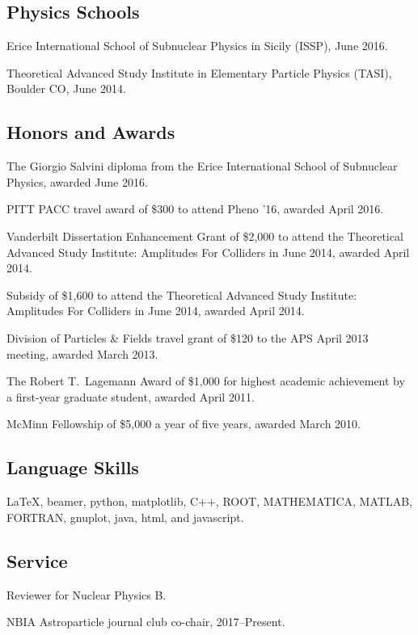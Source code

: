 \documentclass[letterpaper]{article}
\renewenvironment{itemize}{
\begin{list}{}{
\setlength{\leftmargin}{1.5em}
}
}{
\end{list}
}
\begin{document}
\subsection*{Physics Schools}
\begin{itemize}
\item Erice International School of Subnuclear Physics in Sicily (ISSP), June 2016.
\item Theoretical Advanced Study Institute in Elementary Particle Physics (TASI), Boulder CO, June 2014.
\end{itemize}

\subsection*{Honors and Awards}
\begin{itemize}
\item The Giorgio Salvini diploma from the Erice International School of Subnuclear Physics, awarded June 2016.
\item PITT PACC travel award of \$300 to attend Pheno '16, awarded April 2016.
\item Vanderbilt Dissertation Enhancement Grant of \$2,000 to attend the Theoretical Advanced Study Institute: Amplitudes For Colliders
in June 2014, awarded April 2014.
\item Subsidy of \$1,600 to attend the Theoretical Advanced Study Institute: Amplitudes For Colliders in June 2014, awarded April 2014.
\item Division of Particles \& Fields travel grant of \$120 to the APS April 2013 meeting, awarded March 2013.
\item The Robert T.~Lagemann Award of \$1,000 for highest academic achievement by a first-year graduate student, awarded April 2011.
\item McMinn Fellowship of \$5,000 a year of five years, awarded March 2010.
\end{itemize}

\subsection*{Language Skills}
\begin{itemize}
\item 
\LaTeX, beamer, python, matplotlib, C++, ROOT, MATHEMATICA, MATLAB, FORTRAN, gnuplot, java, html, and javascript.
\end{itemize}

\subsection*{Service}
\begin{itemize}
\item Reviewer for Nuclear Physics B.
\item NBIA Astroparticle journal club co-chair, 2017--Present.
\end{itemize}
\end{document}
